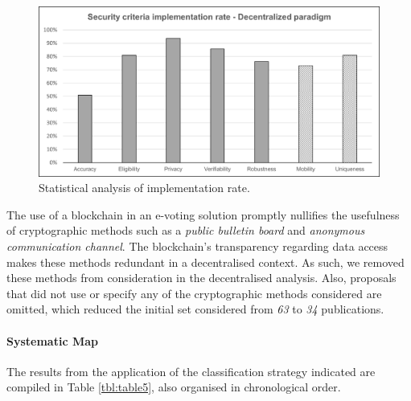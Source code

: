 \documentclass[../access.tex]{subfiles}
\begin{document}
\begin{figure}[ht!]
    \centering
    \includegraphics[width=\columnwidth]{Images/almei5.png}
    \caption{Statistical analysis of implementation rate.}
    \label{fig:implementation-rate-decentralized}
\end{figure}

The use of a blockchain in an e-voting solution promptly nullifies the usefulness of cryptographic methods such as a \textit{public bulletin board} and \textit{anonymous communication channel}. The blockchain's transparency regarding data access makes these methods redundant in a decentralised context. As such, we removed these methods from consideration in the decentralised analysis. Also, proposals that did not use or specify any of the cryptographic methods considered are omitted, which reduced the initial set considered from \textit{63} to \textit{34} publications.

\paragraph{Systematic Map}
The results from the application of the classification strategy indicated are compiled in Table \ref{tbl:table5}, also organised in chronological order.
\end{document}
